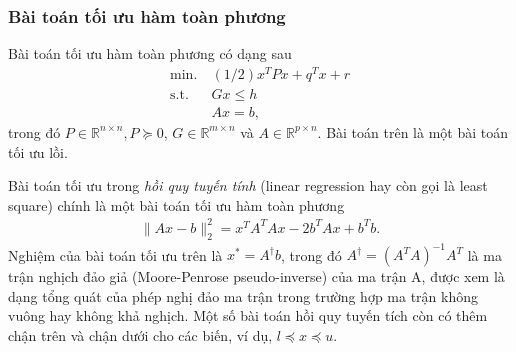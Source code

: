 \documentclass{book}
\begin{document}
\subsubsection*{Bài toán tối ưu hàm toàn phương}
Bài toán tối ưu hàm toàn phương có dạng sau
\begin{align*}
\mathrm{min.}~ & (1/2) x^T P x + q^T x + r \\
\mathrm{s.t.}~ & Gx \leq h \\
			& A x = b,
\end{align*}
trong đó $P \in \mathbb{R}^{n \times n}, P \succeq 0$, $G \in \mathbb{R}^{m \times n}$ và  $A \in \mathbb{R}^{p \times n}$.
Bài toán trên là một bài toán tối ưu lồi.

Bài toán tối ưu trong \textit{hồi quy tuyến tính} (linear regression hay còn gọi là least square) chính là một bài toán tối ưu hàm toàn phương 
\begin{align*}
\| Ax - b\|^2_2 = x^T A^T A x - 2b^T A x + b^T b.
\end{align*}
Nghiệm của bài toán tối ưu trên là $x^* = A^\dagger b$, trong đó $A^\dagger = (A^T A)^{-1} A^T$ là ma trận nghịch đảo giả (Moore-Penrose pseudo-inverse) của ma trận A, được xem là dạng tổng quát của phép nghị đảo ma trận trong trường hợp ma trận không vuông hay không khả nghịch.
Một số bài toán hồi quy tuyến tích còn có thêm chận trên và chận dưới cho các biến, ví dụ, $l \preceq x \preceq u$.


\end{document}
